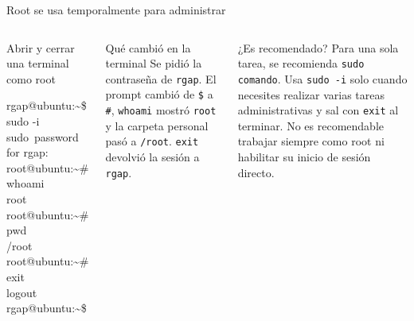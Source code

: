 \documentclass[aspectratio=169,10pt,c]{beamer}
\begin{document}
\begin{frame}{Root se usa temporalmente para administrar}
\begin{columns}[T,onlytextwidth]
\begin{exampleblock}{Abrir y cerrar una terminal como root}
\begin{terminal}\footnotesize
rgap@ubuntu:\textasciitilde\$ sudo -i\\
\lbrack sudo\rbrack~password for rgap:\\
root@ubuntu:\textasciitilde\# whoami\\
root\\
root@ubuntu:\textasciitilde\# pwd\\
/root\\
root@ubuntu:\textasciitilde\# exit\\
logout\\
rgap@ubuntu:\textasciitilde\$
\end{terminal}
\end{exampleblock}
\begin{block}{Qué cambió en la terminal}
\footnotesize Se pidió la contraseña de \texttt{rgap}. El prompt cambió de \texttt{\$} a \texttt{\#}, \texttt{whoami} mostró \texttt{root} y la carpeta personal pasó a \texttt{/root}. \texttt{exit} devolvió la sesión a \texttt{rgap}.
\end{block}
\begin{alertblock}{¿Es recomendado?}
\footnotesize Para una sola tarea, se recomienda \texttt{sudo comando}. Usa \texttt{sudo -i} solo cuando necesites realizar varias tareas administrativas y sal con \texttt{exit} al terminar. No es recomendable trabajar siempre como root ni habilitar su inicio de sesión directo.
\end{alertblock}
\end{columns}
\end{frame}
\end{document}
